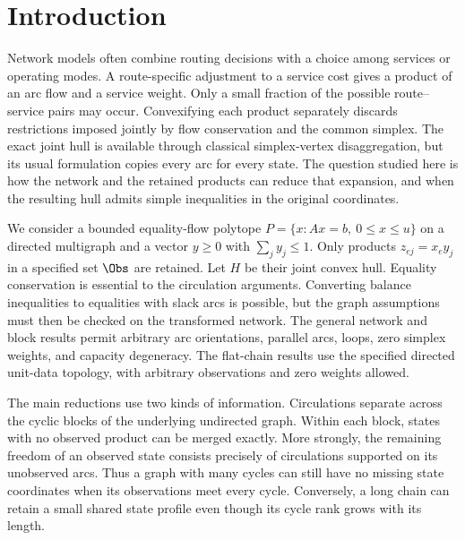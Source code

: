 \section{Introduction}\label{sec:introduction}
Network models often combine routing decisions with a choice among services
or operating modes. A route-specific adjustment to a service cost gives a
product of an arc flow and a service weight. Only a small fraction of the
possible route--service pairs may occur. Convexifying each product separately
discards restrictions imposed jointly by flow conservation and the common
simplex. The exact joint hull is available through classical simplex-vertex
disaggregation, but its usual formulation copies every arc for every state.
The question studied here is how the network and the retained products can
reduce that expansion, and when the resulting hull admits simple inequalities
in the original coordinates.

We consider a bounded equality-flow polytope
$P=\{x:Ax=b,\ 0\le x\le u\}$ on a directed multigraph and a vector
$y\ge0$ with $\sum_jy_j\le1$. Only products $z_{ej}=x_e y_j$ in a
specified set $\Obs$ are retained. Let $H$ be their joint convex hull.
Equality conservation is essential to the circulation arguments. Converting
balance inequalities to equalities with slack arcs is possible, but the graph
assumptions must then be checked on the transformed network. The general
network and block results permit arbitrary arc orientations, parallel arcs,
loops, zero simplex weights, and capacity degeneracy. The flat-chain results
use the specified directed unit-data topology, with arbitrary observations
and zero weights allowed.

The main reductions use two kinds of information. Circulations separate across
the cyclic blocks of the underlying undirected graph. Within each block,
states with no observed product can be merged exactly. More strongly, the
remaining freedom of an observed state consists precisely of circulations
supported on its unobserved arcs. Thus a graph with many cycles can still
have no missing state coordinates when its observations meet every cycle.
Conversely, a long chain can retain a small shared state profile even though
its cycle rank grows with its length.

